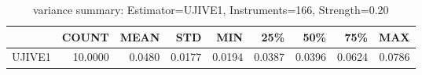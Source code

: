 \begin{table}[ht]
\centering
\caption{variance summary: Estimator=UJIVE1, Instruments=166, Strength=0.20}
\begin{tabular}{lrrrrrrrr}
\toprule
 & COUNT & MEAN & STD & MIN & 25\% & 50\% & 75\% & MAX \\
\midrule
UJIVE1 & 10.0000 & 0.0480 & 0.0177 & 0.0194 & 0.0387 & 0.0396 & 0.0624 & 0.0786 \\
\bottomrule
\end{tabular}
\end{table}
